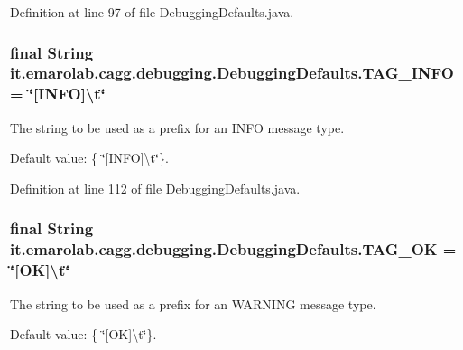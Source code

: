 Definition at line 97 of file Debugging\-Defaults.\-java.

\hypertarget{classit_1_1emarolab_1_1cagg_1_1debugging_1_1DebuggingDefaults_a0479528bb8c46a8159792c7f656ad135}{
\subsubsection[{T\-A\-G\-\_\-\-I\-N\-F\-O}]{\setlength{\rightskip}{0pt plus 5cm}final String it.\-emarolab.\-cagg.\-debugging.\-Debugging\-Defaults.\-T\-A\-G\-\_\-\-I\-N\-F\-O = \char`\"{}\mbox{[}I\-N\-F\-O\mbox{]}\textbackslash{}t\char`\"{}\hspace{0.3cm}{\ttfamily [static]}}}\label{classit_1_1emarolab_1_1cagg_1_1debugging_1_1DebuggingDefaults_a0479528bb8c46a8159792c7f656ad135}
The string to be used as a prefix for an I\-N\-F\-O message type.\par
 Default value\-: \{ \char`\"{}\mbox{[}\-I\-N\-F\-O\mbox{]}\textbackslash{}t\char`\"{}\}. 

Definition at line 112 of file Debugging\-Defaults.\-java.

\hypertarget{classit_1_1emarolab_1_1cagg_1_1debugging_1_1DebuggingDefaults_a34e7b6f2dc08c81c1c01f76c675df1e5}{
\subsubsection[{T\-A\-G\-\_\-\-O\-K}]{\setlength{\rightskip}{0pt plus 5cm}final String it.\-emarolab.\-cagg.\-debugging.\-Debugging\-Defaults.\-T\-A\-G\-\_\-\-O\-K = \char`\"{}\mbox{[}O\-K\mbox{]}\textbackslash{}t\char`\"{}\hspace{0.3cm}{\ttfamily [static]}}}\label{classit_1_1emarolab_1_1cagg_1_1debugging_1_1DebuggingDefaults_a34e7b6f2dc08c81c1c01f76c675df1e5}
The string to be used as a prefix for an W\-A\-R\-N\-I\-N\-G message type.\par
 Default value\-: \{ \char`\"{}\mbox{[}\-O\-K\mbox{]}\textbackslash{}t\char`\"{}\}. 

